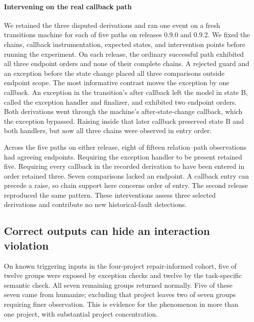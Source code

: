 \documentclass[conference]{IEEEtran}
\begin{document}
\paragraph{Intervening on the real callback path}
We retained the three disputed derivations and ran one event on a fresh transitions machine for each of five paths on releases 0.9.0 and 0.9.2. We fixed the chains, callback instrumentation, expected states, and intervention points before running the experiment. On each release, the ordinary successful path exhibited all three endpoint orders and none of their complete chains. A rejected guard and an exception before the state change placed all three comparisons outside endpoint scope. The most informative contrast moves the exception by one callback. An exception in the transition's after callback left the model in state B, called the exception handler and finalizer, and exhibited two endpoint orders. Both derivations went through the machine's after-state-change callback, which the exception bypassed. Raising inside that later callback preserved state B and both handlers, but now all three chains were observed in entry order.

Across the five paths on either release, eight of fifteen relation--path observations had agreeing endpoints. Requiring the exception handler to be present retained five. Requiring every callback in the recorded derivation to have been entered in order retained three. Seven comparisons lacked an endpoint. A callback entry can precede a raise, so chain support here concerns order of entry. The second release reproduced the same pattern. These interventions assess three selected derivations and contribute no new historical-fault detections.

\subsection{Correct outputs can hide an interaction violation}
On known triggering inputs in the four-project repair-informed cohort, five of twelve groups were exposed by exception checks and twelve by the task-specific semantic check. All seven remaining groups returned normally. Five of these seven came from humanize; excluding that project leaves two of seven groups requiring finer observation. This is evidence for the phenomenon in more than one project, with substantial project concentration.
\end{document}
